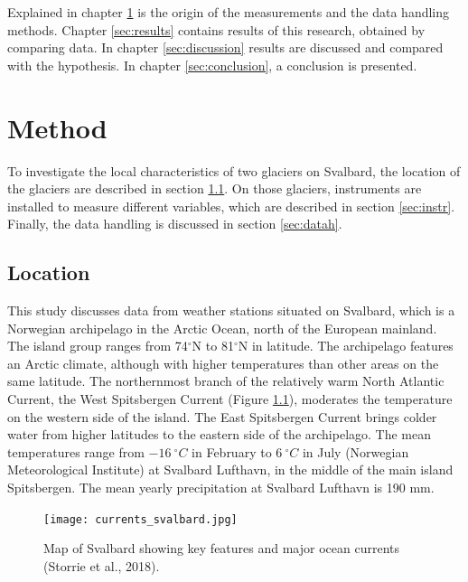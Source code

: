\documentclass[11pt]{report}
\begin{document}
Explained in chapter \ref{sec:method} is the origin of the measurements and the data handling methods. Chapter \ref{sec:results} contains results of this research, obtained by comparing data. In chapter \ref{sec:discussion} results are discussed and compared with the hypothesis. In chapter \ref{sec:conclusion}, a conclusion is presented.

\newpage

\chapter{Method}\label{sec:method}

To investigate the local characteristics of two glaciers on Svalbard, the location of the glaciers are described in section \ref{sec:loc}. On those glaciers, instruments are installed to measure different variables, which are described in section \ref{sec:instr}. Finally, the data handling is discussed in section \ref{sec:datah}.


\section{Location} \label{sec:loc}
This study discusses data from weather stations situated on Svalbard, which is a Norwegian archipelago in the Arctic Ocean, north of the European mainland. The island group ranges from 74$^\circ$N to 81$^\circ$N in latitude. The archipelago features an Arctic climate, although with higher temperatures than other areas on the same latitude.  The northernmost branch of the relatively warm North Atlantic Current, the West Spitsbergen Current (Figure \ref{fig:current}), moderates the temperature on the western side of the island. The East Spitsbergen Current brings colder water from higher latitudes to the eastern side of the archipelago. The mean temperatures range from $\SI{-16}{^\circ C}$ in February to $\SI{6}{^\circ C}$ in July (Norwegian Meteorological Institute) at Svalbard Lufthavn, in the middle of the main island Spitsbergen. The mean yearly precipitation at Svalbard Lufthavn is 190 mm. 
 

\begin{figure}[h]
\texttt{[image: currents\_svalbard.jpg]}
\centering{}
\caption{Map of Svalbard showing key features and major ocean currents (Storrie et al., 2018).}
\label{fig:current}
\end{figure}
\end{document}
